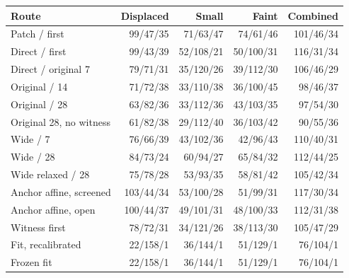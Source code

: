 \begin{tabular}{@{}lrrrr@{}}
\toprule
Route & Displaced & Small & Faint & Combined \\
\midrule
Patch / first & 99/47/35 & 71/63/47 & 74/61/46 & 101/46/34 \\
Direct / first & 99/43/39 & 52/108/21 & 50/100/31 & 116/31/34 \\
Direct / original 7 & 79/71/31 & 35/120/26 & 39/112/30 & 106/46/29 \\
Original / 14 & 71/72/38 & 33/110/38 & 36/100/45 & 98/46/37 \\
Original / 28 & 63/82/36 & 33/112/36 & 43/103/35 & 97/54/30 \\
Original 28, no witness & 61/82/38 & 29/112/40 & 36/103/42 & 90/55/36 \\
Wide / 7 & 76/66/39 & 43/102/36 & 42/96/43 & 110/40/31 \\
Wide / 28 & 84/73/24 & 60/94/27 & 65/84/32 & 112/44/25 \\
Wide relaxed / 28 & 75/78/28 & 53/93/35 & 58/81/42 & 105/42/34 \\
Anchor affine, screened & 103/44/34 & 53/100/28 & 51/99/31 & 117/30/34 \\
Anchor affine, open & 100/44/37 & 49/101/31 & 48/100/33 & 112/31/38 \\
Witness first & 78/72/31 & 34/121/26 & 38/113/30 & 105/47/29 \\
Fit, recalibrated & 22/158/1 & 36/144/1 & 51/129/1 & 76/104/1 \\
Frozen fit & 22/158/1 & 36/144/1 & 51/129/1 & 76/104/1 \\
\bottomrule
\end{tabular}
